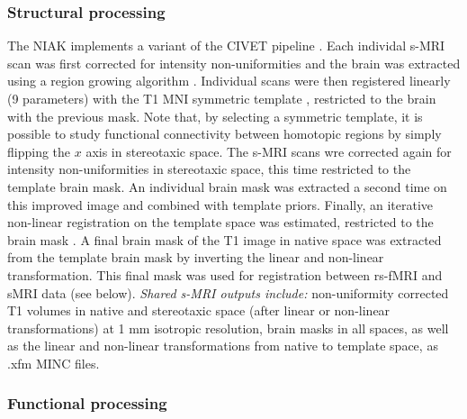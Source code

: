 \documentclass[preprint,12pt,3p]{elsarticle}
\begin{document}
\subsubsection{Structural processing} The NIAK implements a variant of the CIVET pipeline \cite{ad2006civet}. Each individal s-MRI scan was first corrected for intensity non-uniformities \cite{sled1998nonparametric} and the brain was extracted using a region growing algorithm \cite{park2009skull}. Individual scans were then registered linearly (9 parameters) with the T1 MNI symmetric template \cite{fonov2011unbiased}, restricted to the brain with the previous mask. Note that, by selecting a symmetric template, it is possible to study functional connectivity between homotopic regions by simply flipping the $x$ axis in stereotaxic space. The s-MRI scans wre corrected again for intensity non-uniformities in stereotaxic space, this time restricted to the template brain mask. An individual brain mask was extracted a second time on this improved image \cite{park2009skull} and combined with template priors. Finally, an iterative non-linear registration on the template space was estimated, restricted to the brain mask \cite{collins1994automatic}. A final brain mask of the T1 image in native space was extracted from the template brain mask by inverting the linear and non-linear transformation. This final mask was used for registration between rs-fMRI and sMRI data (see below). \emph{Shared s-MRI outputs include:} non-uniformity corrected T1 volumes in native and stereotaxic space (after linear or non-linear transformations) at 1 mm isotropic resolution, brain masks in all spaces, as well as the linear and non-linear transformations from native to template space, as .xfm MINC files. 

\subsubsection{Functional processing} 
\end{document}
